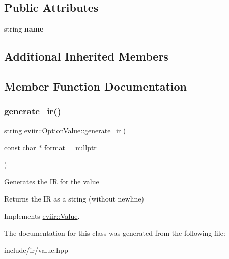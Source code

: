 \subsection*{Public Attributes}
\begin{DoxyCompactItemize}
\item 
\mbox{\label{classeviir_1_1OptionValue_ab8b3c911a0116a463813ffe5c7cf3c8f}} 
string {\bfseries name}
\end{DoxyCompactItemize}
\subsection*{Additional Inherited Members}


\subsection{Member Function Documentation}
\mbox{\label{classeviir_1_1OptionValue_abb9e9cbaa9f6c0af697e5cbea035f56a}} 
\subsubsection{\texorpdfstring{generate\+\_\+ir()}{generate\_ir()}}
{\footnotesize\ttfamily string eviir\+::\+Option\+Value\+::generate\+\_\+ir (\begin{DoxyParamCaption}\item[{const char $\ast$}]{format = {\ttfamily nullptr} }\end{DoxyParamCaption})\hspace{0.3cm}{\ttfamily [virtual]}}

Generates the IR for the value \begin{DoxyReturn}{Returns}
the IR as a string (without newline) 
\end{DoxyReturn}


Implements \hyperlink{classeviir_1_1Value_a0613bf660425df31e230681555f64dea}{eviir\+::\+Value}.



The documentation for this class was generated from the following file\+:\begin{DoxyCompactItemize}
\item 
include/ir/value.\+hpp\end{DoxyCompactItemize}
